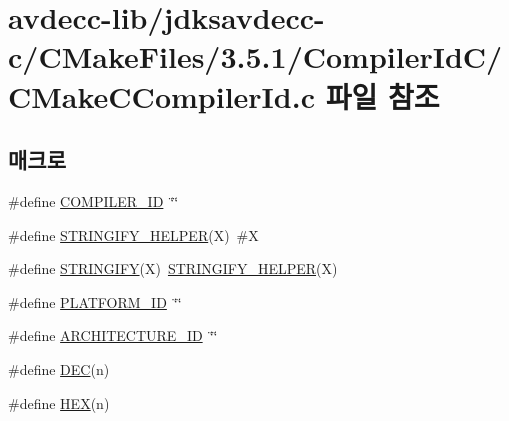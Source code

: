 \hypertarget{avdecc-lib_2jdksavdecc-c_2_c_make_files_23_85_81_2_compiler_id_c_2_c_make_c_compiler_id_8c}{}\section{avdecc-\/lib/jdksavdecc-\/c/\+C\+Make\+Files/3.5.1/\+Compiler\+Id\+C/\+C\+Make\+C\+Compiler\+Id.c 파일 참조}
\label{avdecc-lib_2jdksavdecc-c_2_c_make_files_23_85_81_2_compiler_id_c_2_c_make_c_compiler_id_8c}
\subsection*{매크로}
\begin{DoxyCompactItemize}
\item 
\#define \hyperlink{avdecc-lib_2jdksavdecc-c_2_c_make_files_23_85_81_2_compiler_id_c_2_c_make_c_compiler_id_8c_a81dee0709ded976b2e0319239f72d174}{C\+O\+M\+P\+I\+L\+E\+R\+\_\+\+ID}~\char`\"{}\char`\"{}
\item 
\#define \hyperlink{avdecc-lib_2jdksavdecc-c_2_c_make_files_23_85_81_2_compiler_id_c_2_c_make_c_compiler_id_8c_a2ae9b72bb13abaabfcf2ee0ba7d3fa1d}{S\+T\+R\+I\+N\+G\+I\+F\+Y\+\_\+\+H\+E\+L\+P\+ER}(X)~\#X
\item 
\#define \hyperlink{avdecc-lib_2jdksavdecc-c_2_c_make_files_23_85_81_2_compiler_id_c_2_c_make_c_compiler_id_8c_a43e1cad902b6477bec893cb6430bd6c8}{S\+T\+R\+I\+N\+G\+I\+FY}(X)~\hyperlink{lib_2avtp__pipeline_2build__avdecc_2_c_make_files_23_85_81_2_compiler_id_c_x_x_2_c_make_c_x_x_compiler_id_8cpp_a2ae9b72bb13abaabfcf2ee0ba7d3fa1d}{S\+T\+R\+I\+N\+G\+I\+F\+Y\+\_\+\+H\+E\+L\+P\+ER}(X)
\item 
\#define \hyperlink{avdecc-lib_2jdksavdecc-c_2_c_make_files_23_85_81_2_compiler_id_c_2_c_make_c_compiler_id_8c_adbc5372f40838899018fadbc89bd588b}{P\+L\+A\+T\+F\+O\+R\+M\+\_\+\+ID}~\char`\"{}\char`\"{}
\item 
\#define \hyperlink{avdecc-lib_2jdksavdecc-c_2_c_make_files_23_85_81_2_compiler_id_c_2_c_make_c_compiler_id_8c_aba35d0d200deaeb06aee95ca297acb28}{A\+R\+C\+H\+I\+T\+E\+C\+T\+U\+R\+E\+\_\+\+ID}~\char`\"{}\char`\"{}
\item 
\#define \hyperlink{avdecc-lib_2jdksavdecc-c_2_c_make_files_23_85_81_2_compiler_id_c_2_c_make_c_compiler_id_8c_ad1280362da42492bbc11aa78cbf776ad}{D\+EC}(n)
\item 
\#define \hyperlink{avdecc-lib_2jdksavdecc-c_2_c_make_files_23_85_81_2_compiler_id_c_2_c_make_c_compiler_id_8c_a46d5d95daa1bef867bd0179594310ed5}{H\+EX}(n)
\end{DoxyCompactItemize}
